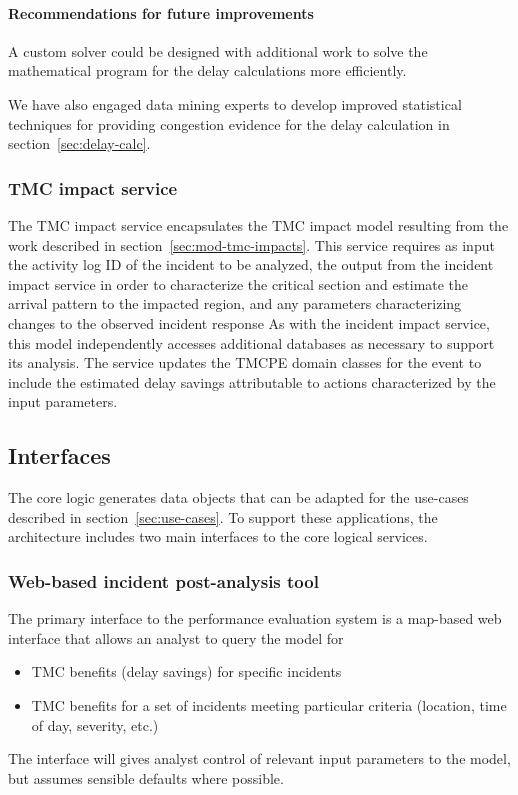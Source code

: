 \documentclass[12pt]{report}
\newcounter{time}
\begin{document}
\paragraph{Recommendations for future improvements}

A custom solver could be designed with additional work to solve the
mathematical program for the delay calculations more efficiently.

We have also engaged data mining experts to develop improved
statistical techniques for providing congestion evidence for the delay
calculation in section~\ref{sec:delay-calc}.


\subsubsection{TMC impact service}
\label{sec:tmc-impact-service}
The \ac{TMC} impact service encapsulates the \ac{TMC} impact model resulting
from the work described in section~\ref{sec:mod-tmc-impacts}.  This
service requires as input the activity log ID of the incident to be
analyzed, the output from the incident impact service in order to
characterize the critical section and estimate the arrival pattern to
the impacted region, and any parameters characterizing changes to the
observed incident response As with the incident impact service, this
model independently accesses additional databases as necessary to
support its analysis.  The service updates the \ac{TMCPE} domain classes
for the event to include the estimated delay savings attributable to
actions characterized by the input parameters.




\subsection{Interfaces}
\label{sec:interfaces}

The core logic generates data objects that can be adapted for the
use-cases described in section~\ref{sec:use-cases}.  To support these
applications, the architecture includes two main interfaces to the
core logical services.  

\subsubsection{Web-based incident post-analysis tool}

The primary interface to the performance evaluation system is a
map-based web interface that allows an analyst to query the model for
\begin{itemize}
\item \ac{TMC} benefits (delay savings) for specific incidents
\item \ac{TMC} benefits for a set of incidents meeting particular criteria
  (location, time of day, severity, etc.)
\end{itemize}
The interface will gives analyst control of relevant input parameters
to the model, but assumes sensible defaults where possible.
\end{document}
